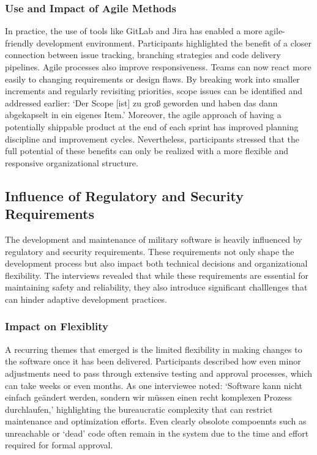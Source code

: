 \subsubsection{Use and Impact of Agile Methods}
In practice, the use of tools like GitLab and Jira has enabled a more agile-friendly development environment. Participants highlighted the benefit of a closer connection between issue tracking, branching strategies and code delivery pipelines. 
Agile processes also improve responsiveness. Teams can now react more easily to changing requirements or design flaws. By breaking work into smaller increments and regularly revisiting priorities, scope issues can be identified and addressed earlier:
`Der Scope [ist] zu groß geworden und haben das dann abgekapselt in ein eigenes Item.' Moreover, the agile approach of having a potentially shippable product at the end of each sprint has improved planning discipline and improvement cycles.
Nevertheless, participants stressed that the full potential of these benefits can only be realized with a more flexible and responsive organizational structure.\\

\subsection{Influence of Regulatory and Security Requirements}
The development and maintenance of military software is heavily influenced by regulatory and security requirements. These requirements not only shape the development process but also impact both technical decisions and organizational flexibility.
The interviews revealed that while these requirements are essential for maintaining safety and reliability, they also introduce significant challlenges that can hinder adaptive development practices.

\subsubsection{Impact on Flexiblity}
A recurring themes that emerged is the limited flexibility in making changes to the software once it has been delivered. Participants described how even minor adjustments need to pass through extensive testing and approval processes, which can take weeks or even months.
As one interviewee noted: `Software kann nicht einfach geändert werden, sondern wir müssen einen recht komplexen Prozess durchlaufen,' highlighting the bureaucratic complexity that can restrict maintenance and optimization efforts. Even clearly obsolote compoennts such as unreachable or `dead' code
often remain in the system due to the time and effort required for formal approval.\\

